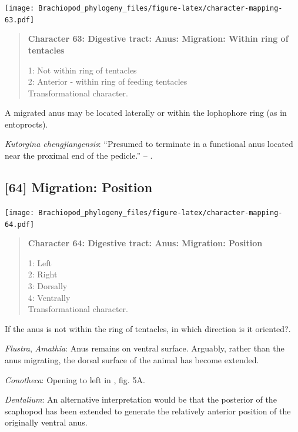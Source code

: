 \documentclass[openany]{book}
\begin{document}
\texttt{[image: Brachiopod\_phylogeny\_files/figure-latex/character-mapping-63.pdf]}

\begin{quote}
\textbf{Character 63: Digestive tract: Anus: Migration: Within ring of
tentacles}

1: Not within ring of tentacles\\
2: Anterior - within ring of feeding tentacles\\
Transformational character.
\end{quote}

A migrated anus may be located laterally or within the lophophore ring
(as in entoprocts).

\hypertarget{Kutorgina_chengjiangensis-coding-63}{}
\emph{Kutorgina chengjiangensis}: ``Presumed to terminate in a
functional anus located near the proximal end of the pedicle.'' --
\citet{Zhang2007Rhynchonelliformeanbrachiopods}.

\subsection*{{[}64{]} Migration: Position}\label{migration-position}

\texttt{[image: Brachiopod\_phylogeny\_files/figure-latex/character-mapping-64.pdf]}

\begin{quote}
\textbf{Character 64: Digestive tract: Anus: Migration: Position}

1: Left\\
2: Right\\
3: Dorsally\\
4: Ventrally\\
Transformational character.
\end{quote}

If the anus is not within the ring of tentacles, in which direction is
it oriented?.

\hypertarget{Amathia-coding-64}{}
\emph{Flustra}, \emph{Amathia}: Anus remains on ventral surface.
Arguably, rather than the anus migrating, the dorsal surface of the
animal has become extended.

\hypertarget{Conotheca-coding-64}{}
\emph{Conotheca}: Opening to left in \citet{Devaere2014}, fig. 5A.

\hypertarget{Dentalium-coding-64}{}
\emph{Dentalium}: An alternative interpretation would be that the
posterior of the scaphopod has been extended to generate the relatively
anterior position of the originally ventral anus.
\end{document}
